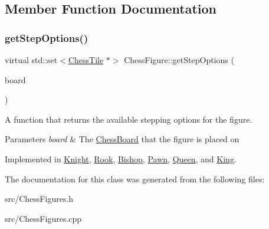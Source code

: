 \subsection{Member Function Documentation}
\mbox{\label{classChessFigure_ae78d52e35c4ea926f492d211c69758bd}} 
\subsubsection{\texorpdfstring{get\+Step\+Options()}{getStepOptions()}}
{\footnotesize\ttfamily virtual std\+::set$<$\mbox{\hyperlink{classChessTile}{Chess\+Tile}} $\ast$$>$ Chess\+Figure\+::get\+Step\+Options (\begin{DoxyParamCaption}\item[{\mbox{\hyperlink{classChessBoard}{Chess\+Board}} \&}]{board }\end{DoxyParamCaption})\hspace{0.3cm}{\ttfamily [pure virtual]}}



A function that returns the available stepping options for the figure. 


\begin{DoxyParams}{Parameters}
{\em board} & The \mbox{\hyperlink{classChessBoard}{Chess\+Board}} that the figure is placed on \\
\hline
\end{DoxyParams}


Implemented in \mbox{\hyperlink{classKnight_abb638cd75748653ec35365a77d528c42}{Knight}}, \mbox{\hyperlink{classRook_a466f48269ca58857c2a1ab1ab92c91f8}{Rook}}, \mbox{\hyperlink{classBishop_a5da898db86a3025a5064d2d6ea2f1148}{Bishop}}, \mbox{\hyperlink{classPawn_aa05272b9dcf50914ca51c5be1fe2d014}{Pawn}}, \mbox{\hyperlink{classQueen_a0fe4b1feaa74c1b2879ce991771054b0}{Queen}}, and \mbox{\hyperlink{classKing_a69703f80ac8c30335e4d745ee11518d7}{King}}.



The documentation for this class was generated from the following files\+:\begin{DoxyCompactItemize}
\item 
src/Chess\+Figures.\+h\item 
src/Chess\+Figures.\+cpp\end{DoxyCompactItemize}
